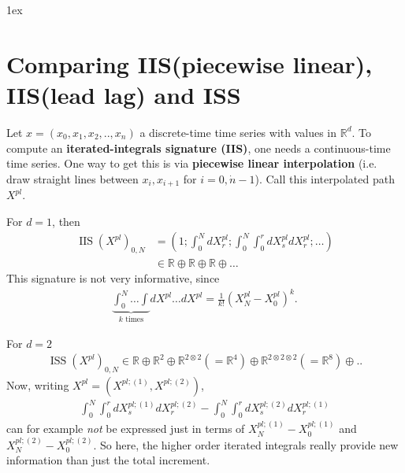 \documentclass{scrartcl}
\theoremstyle{plain}
\theoremstyle{definition}
\newcommand{\R}{\mathbb{R}}
\begin{document}

\parindent0pt           
\parskip1ex            



\title{}
\author{ }

\newcommand\ISS{\operatorname{ISS}}
\newcommand\IIS{\operatorname{IIS}}

\tableofcontents


\section{Comparing IIS(piecewise linear), IIS(lead lag) and ISS}


Let $x=(x_0,x_1,x_2,..,x_n)$ a discrete-time time series with values in $\R^d$.
To compute an \textbf{iterated-integrals signature (IIS)},
one needs a continuous-time time series.
One way to get this is via \textbf{piecewise linear interpolation} (i.e. draw straight lines between $x_i,x_{i+1}$ for $i=0,\dot n-1$).
Call this interpolated path $X^{pl}$.

For $d=1$, then
\begin{align*}
  \IIS( X^{pl} )_{0,N}
  &= (1; \int_0^N dX^{pl}_r; \int_{0}^N \int_0^r dX^{pl}_s dX^{pl}_r; \dots) \\
  &\in \R \oplus \R \oplus \R \oplus \dots 
\end{align*}
This signature is not very informative, since
\begin{align*}
  \underbrace{\int_0^N \dots \int}_{k\text{ times}} dX^{pl} \dots dX^{pl}
  =
  \frac{1}{k!} (X^{pl}_N - X^{pl}_0)^k.
\end{align*}

For $d=2$
\begin{align*}
  \ISS( X^{pl} )_{0,N} \in \R \oplus \R^{2} \oplus \R^{2\otimes2} (= \R^4) \oplus \R^{2\otimes 2\otimes 2} (= \R^8) \oplus ..
\end{align*}
Now, writing $X^{pl} = (X^{pl;(1)},X^{pl;(2)})$,
\begin{align*}
  \int_0^N \int_0^r dX^{pl;(1)}_s dX^{pl;(2)}_r
  -
  \int_0^N \int_0^r dX^{pl;(2)}_s dX^{pl;(1)}_r
\end{align*}
can for example \emph{not} be expressed just in terms of $X^{pl;(1)}_N - X^{pl;(1)}_0$ and $X^{pl;(2)}_N - X^{pl;(2)}_0$.
So here, the higher order iterated integrals really provide new information than just the total increment.
\end{document}
